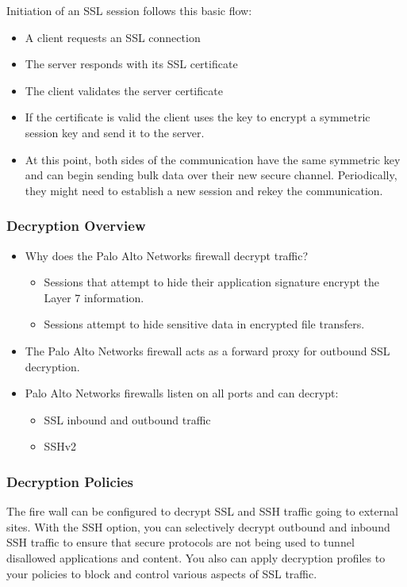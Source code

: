 Initiation of an SSL session follows this basic flow:
\begin{itemize}
    \item A client requests an SSL connection
    \item The server responds with its SSL certificate
    \item The client validates the server certificate
    \item If the certificate is valid the client uses the key to encrypt a symmetric session key and send it to the server.
    \item At this point, both sides of the communication have the same symmetric key and can begin sending bulk data over their new secure channel. Periodically, they might need to establish a new session and rekey the communication.
\end{itemize}

\subsubsection{Decryption Overview}
\begin{itemize}
    \item Why does the Palo Alto Networks firewall decrypt traffic?
        \begin{itemize}
            \item Sessions that attempt to hide their application signature encrypt the Layer 7 information.
            \item Sessions attempt to hide sensitive data in encrypted file transfers.
        \end{itemize}
    \item The Palo Alto Networks firewall acts as a forward proxy for outbound SSL decryption.
    \item Palo Alto Networks firewalls listen on all ports and can decrypt:
        \begin{itemize}
            \item SSL inbound and outbound traffic
            \item SSHv2
        \end{itemize}
\end{itemize}

\subsubsection{Decryption Policies}
The fire wall can be configured to decrypt SSL and SSH traffic going to external sites.
With the SSH option, you can selectively decrypt outbound and inbound SSH traffic to ensure that secure protocols are not being used to tunnel disallowed applications and content.
You also can apply decryption profiles to your policies to block and control various aspects of SSL traffic.

